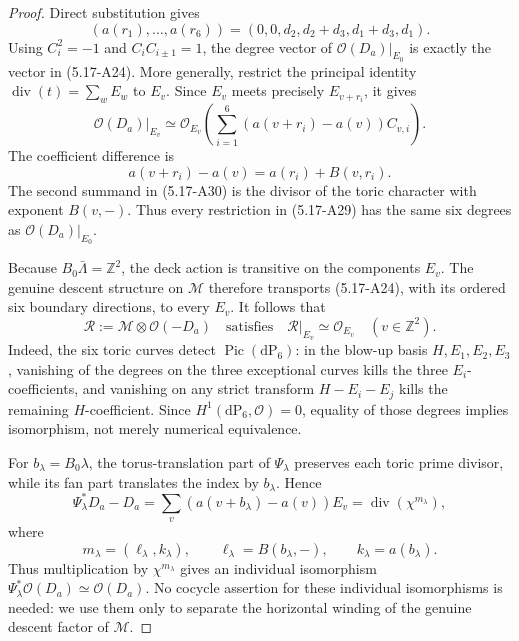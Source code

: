 \begin{proof}
Direct substitution gives
\[
 (a(r_1),\ldots,a(r_6))
 =(0,0,d_2,d_2+d_3,d_1+d_3,d_1).
\tag{5.17-A28}
\]
Using \(C_i^2=-1\) and \(C_iC_{i\pm1}=1\), the degree vector of
\(\mathcal O(D_a)|_{E_0}\) is exactly the vector in (5.17-A24).  More
generally, restrict the principal identity
\(\operatorname{div}(t)=\sum_wE_w\) to \(E_v\).  Since \(E_v\) meets
precisely \(E_{v+r_i}\), it gives
\[
 \mathcal O(D_a)|_{E_v}
 \simeq
 \mathcal O_{E_v}\!\left(
   \sum_{i=1}^6(a(v+r_i)-a(v))C_{v,i}
 \right).
\tag{5.17-A29}
\]
The coefficient difference is
\[
 a(v+r_i)-a(v)=a(r_i)+B(v,r_i).
\tag{5.17-A30}
\]
The second summand in (5.17-A30) is the divisor of the toric character
with exponent \(B(v,-)\).  Thus every restriction in (5.17-A29) has the
same six degrees as \(\mathcal O(D_a)|_{E_0}\).

Because \(B_0\bar\Lambda=\mathbb Z^2\), the deck action is transitive on
the components \(E_v\).  The genuine descent structure on \(\mathcal M\)
therefore transports (5.17-A24), with its ordered six boundary directions,
to every \(E_v\).  It follows that
\[
 \mathcal R:=\mathcal M\otimes\mathcal O(-D_a)
 \quad\text{satisfies}\quad
 \mathcal R|_{E_v}\simeq\mathcal O_{E_v}
 \quad(v\in\mathbb Z^2).
\tag{5.17-A31}
\]
Indeed, the six toric curves detect \(\operatorname{Pic}(\mathrm{dP}_6)\):
in the blow-up basis \(H,E_1,E_2,E_3\), vanishing of the degrees on the
three exceptional curves kills the three \(E_i\)-coefficients, and
vanishing on any strict transform \(H-E_i-E_j\) kills the remaining
\(H\)-coefficient.  Since
\(H^1(\mathrm{dP}_6,\mathcal O)=0\), equality of those degrees implies
isomorphism, not merely numerical equivalence.

For \(b_\lambda=B_0\lambda\), the torus-translation part of
\(\Psi_\lambda\) preserves each toric prime divisor, while its fan part
translates the index by \(b_\lambda\).  Hence
\[
 \Psi_\lambda^*D_a-D_a
 =\sum_v(a(v+b_\lambda)-a(v))E_v
 =\operatorname{div}(\chi^{m_\lambda}),
\tag{5.17-A32}
\]
where
\[
 m_\lambda=(\ell_\lambda,k_\lambda),
 \qquad
 \ell_\lambda=B(b_\lambda,-),
 \qquad
 k_\lambda=a(b_\lambda).
\tag{5.17-A33}
\]
Thus multiplication by \(\chi^{m_\lambda}\) gives an individual
isomorphism
\(\Psi_\lambda^*\mathcal O(D_a)\simeq\mathcal O(D_a)\).
No cocycle assertion for these individual isomorphisms is needed: we use
them only to separate the horizontal winding of the genuine descent factor
of \(\mathcal M\).


\end{proof}
